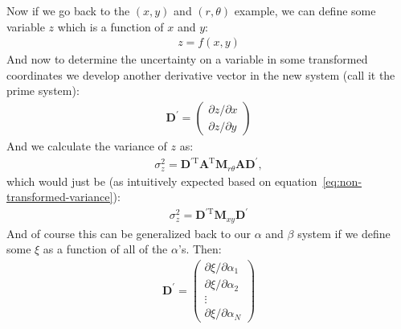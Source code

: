\documentclass{article}
\newcommand{\vecb}[1]{\boldsymbol{\mathbf{#1}}}
\begin{document}
Now if we go back to the $(x,y)$ and $(r,\theta)$ example, we can define some variable $z$ which is a function of $x$ and $y$:
\begin{align*}
  z = f(x,y)
\end{align*}
And now to determine the uncertainty on a variable in some transformed coordinates we develop another derivative vector in the new system (call it the prime system):
\begin{align}
  \vecb{D}^{\prime} = \begin{pmatrix}
    \partial z/\partial x \\
    \partial z/\partial y
  \end{pmatrix}
\end{align}
And we calculate the variance of $z$ as:
\begin{align}
  \sigma_z^2 = \vecb{D}^{\prime\mathrm{T}}\vecb{A}^{\mathrm{T}}\vecb{M}_{r\theta}\vecb{A}\vecb{D}^{\prime},
\end{align}
which would just be (as intuitively expected based on equation~\ref{eq:non-transformed-variance}):
\begin{align}
  \sigma_z^2 = \vecb{D}^{\prime\mathrm{T}}\vecb{M}_{xy}\vecb{D}^{\prime}
\end{align}
And of course this can be generalized back to our $\alpha$ and $\beta$ system if we define some $\xi$ as a function of all of the $\alpha$'s. Then:
\begin{align}
  \vecb{D}^{\prime} = \begin{pmatrix}
    \partial \xi / \partial \alpha_1 \\
    \partial \xi / \partial \alpha_2 \\
    \vdots                           \\
    \partial \xi / \partial \alpha_N
  \end{pmatrix}
\end{align}
\end{document}
